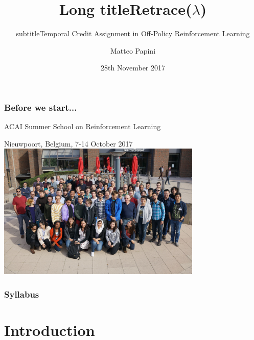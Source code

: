 \documentclass{beamer}
\title[Short title]{Long title}
\subtitle{subtitle}
\title[Retrace]{Retrace($\lambda$)}
\subtitle{Temporal Credit Assignment in Off-Policy Reinforcement Learning}
\author[Matteo Papini]{Matteo Papini}
\date[28/11/17]{28th November 2017}
\begin{document}

\begin{frame}
\titlepage
\end{frame}

\addtocounter{framenumber}{-1}


\begin{frame}
\frametitle{Before we start...}
{ACAI Summer School on Reinforcement Learning

Nieuwpoort, Belgium, 7-14 October 2017 
\centering
\includegraphics[height=6.5cm]{images/summer_school1}
}
\end{frame}

\begin{frame}
\frametitle{Syllabus}
\tableofcontents
\end{frame}

\section{Introduction}
\end{document}
